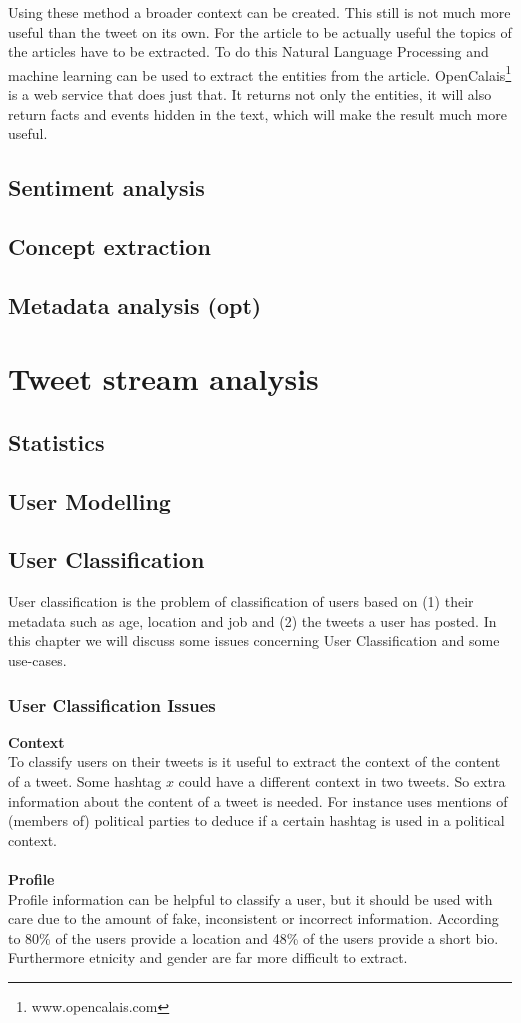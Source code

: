 \documentclass{article}
\begin{document}
Using these method a broader context can be created. This still is not much more useful than the tweet on its own. For the article to be actually useful the topics of the articles have to be extracted. To do this Natural Language Processing and machine learning can be used to extract the entities from the article. OpenCalais\footnote{www.opencalais.com} is a web service that does just that. It returns not only the entities, it will also return facts and events hidden in the text, which will make the result much more useful.
\subsection{Sentiment analysis}
\subsection{Concept extraction}
\subsection{Metadata analysis (opt)}

\section{Tweet stream analysis}
\subsection{Statistics}
\subsection{User Modelling}
\subsection{User Classification}
User classification is the problem of classification of users based on (1) their metadata such as age, location and job and (2) the tweets a user has posted. In this chapter we will discuss some issues concerning User Classification and some use-cases. 

\subsubsection{User Classification Issues}
\textbf{Context}\\
To classify users on their tweets is it useful to extract the context of the content of a tweet. Some hashtag $x$ could have a different context in two tweets. So extra information about the content of a tweet is needed. For instance \cite{userclasst} uses mentions of (members of) political parties to deduce if a certain hashtag is used in a political context. 
\\\\
\textbf{Profile}\\
Profile information can be helpful to classify a user, but it should be used with care due to the amount of fake, inconsistent or incorrect information. According to \cite{usermachine} 80\% of the users provide a location and 48\% of the users provide a short bio. Furthermore etnicity and gender are far more difficult to extract. 
\end{document}
